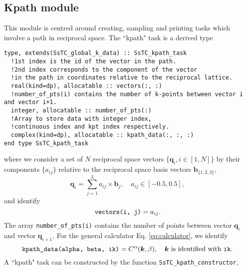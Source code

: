 \documentclass[10pt,a4paper]{article}
\begin{document}
\subsection{Kpath module}
This module is centred around creating, sampling and printing tasks which involve a path in reciprocal space. The ``kpath" task is a derived type
\begin{lstlisting}[caption={Derived type corresponding to a ``kpath" task.},captionpos=b]
type, extends(SsTC_global_k_data) :: SsTC_kpath_task
  !1st index is the id of the vector in the path.
  !2nd index corresponds to the component of the vector
  !in the path in coordinates relative to the reciprocal lattice.
  real(kind=dp), allocatable :: vectors(:, :)
  !number_of_pts(i) contains the number of k-points between vector i and vector i+1.
  integer, allocatable :: number_of_pts(:)
  !Array to store data with integer index,
  !continuous index and kpt index respectively.
  complex(kind=dp), allocatable :: kpath_data(:, :, :)
end type SsTC_kpath_task
\end{lstlisting}
where we consider a set of $N$ reciprocal space vectors $\{\bm{q}_i, i\in[1, N]\}$ by their components $\{a_{ij}\}$ relative to the reciprocal space basis vectors $\bm{b}_{\{1, 2, 3\}}$,
\begin{equation}\label{eq:vec_coords_path}
\bm{q}_i = \sum_{j=1}^3 a_{ij}\times \bm{b}_j, \quad a_{ij}\in\left[-0.5, 0.5\right],
\end{equation}
and identify
\begin{equation}
\verb|vectors(i, j)| = a_{ij}.
\end{equation}
The array \verb|number_of_pts(i)| contains the number of points between vector $\bm{q}_i$ and vector $\bm{q}_{i+1}$. For the general calculator Eq. \eqref{eq:calculator}, we identify
\begin{equation}
\verb|kpath_data(alpha, beta, ik)| = C^{\alpha}(\bm{k},\beta),\quad \bm{k}\text{ is identified with } \verb|ik|.
\end{equation}
A ``kpath" task can be constructed by the function \verb|SsTC_kpath_constructor|,
\end{document}
